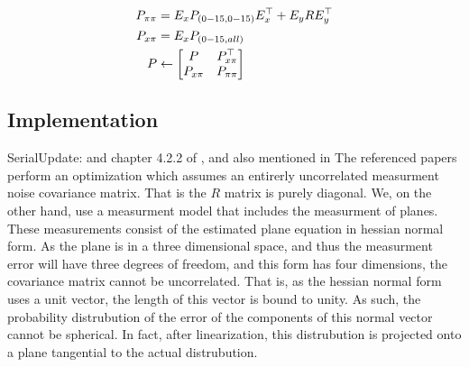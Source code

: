 \documentclass[]{article}
\begin{document}
{\begin{align}
	P_{\pi \pi} &= E_x P_{(0-15,0-15)} E_x^\top + E_y R E_y^\top \notag \\
	P_{x \pi} 	&= E_x P_{(0-15,all)} \notag \\
	P &\leftarrow
	\left[
	\begin{matrix}
		P 			& P_{x \pi}^\top \\
		P_{x \pi}	& P_{\pi \pi}
	\end{matrix}
	\right]
\end{align}


\subsection{Implementation} %
\label{sub:implementation}

SerialUpdate: \cite{OpenPilotPaper} and chapter 4.2.2 of \cite{KFBookSerialupdate}, and also mentioned in \cite{Sola2013}
The referenced papers perform an optimization which assumes an entirerly uncorrelated measurment noise covariance matrix. That is the $R$ matrix is purely diagonal.
We, on the other hand, use a measurment model that includes the measurment of planes. These measurements consist of the estimated plane equation in hessian normal form. As the plane is in a three dimensional space, and thus the measurment error will have three degrees of freedom, and this form has four dimensions, the covariance matrix cannot be uncorrelated.
That is, as the hessian normal form uses a unit vector, the length of this vector is bound to unity. As such, the probability distrubution of the error of the components of this normal vector cannot be spherical.
In fact, after linearization, this distrubution is projected onto a plane tangential to the actual distrubution. 

}
\end{document}
